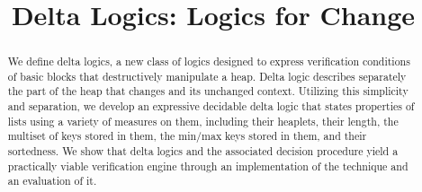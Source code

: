 \documentclass[acmsmall,review,anonymous]{acmart}
\begin{document}
\newcommand{\HLS}{\textit{HLS}}
\newcommand{\sem}[1]{\llbracket #1 \rrbracket}
\newcommand{\vect}[1]{\overline{#1}}
\pagestyle{plain} %

\title{Delta Logics: Logics for Change}


\maketitle

\begin{abstract}
We define delta logics, a new class of logics designed to express verification conditions
of basic blocks that destructively manipulate a heap. Delta logic describes separately the part of the heap that changes
and its unchanged context. Utilizing this simplicity and separation, we develop an expressive decidable
delta logic that states properties of lists using a variety of measures on them, including their heaplets, 
their length, the multiset of keys stored in them, the min/max keys stored in them, and their sortedness. We show that 
delta logics and the associated decision procedure yield a practically viable verification engine through an 
implementation of the technique and an evaluation of it.
\end{abstract}










\newpage






\end{document}
